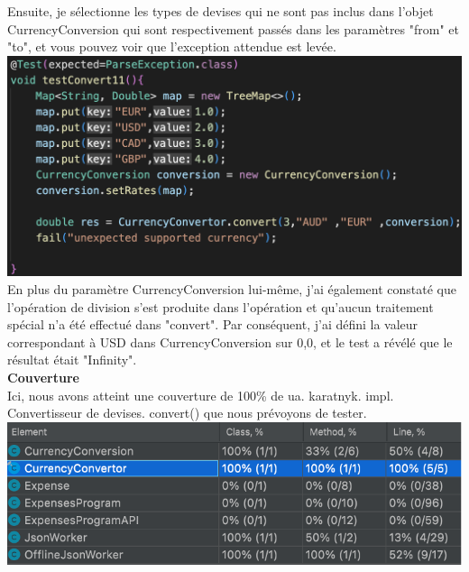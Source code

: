 \documentclass{article}
\begin{document}
Ensuite, je sélectionne les types de devises qui ne sont pas inclus dans l'objet CurrencyConversion qui sont respectivement passés dans les paramètres "from" et "to", et vous pouvez voir que l'exception attendue est levée.\\

\includegraphics[scale=0.4]{G7.png}\\

En plus du paramètre CurrencyConversion lui-même, j'ai également constaté que l'opération de division s'est produite dans l'opération et qu'aucun traitement spécial n'a été effectué dans "convert". Par conséquent, j'ai défini la valeur correspondant à USD dans CurrencyConversion sur 0,0, et le test a révélé que le résultat était "Infinity".\\

\textbf{Couverture}\\

Ici, nous avons atteint une couverture de 100\% de ua. karatnyk. impl. Convertisseur de devises. convert() que nous prévoyons de tester.\\
\includegraphics[scale=0.7]{G8.png}\\
\end{document}
